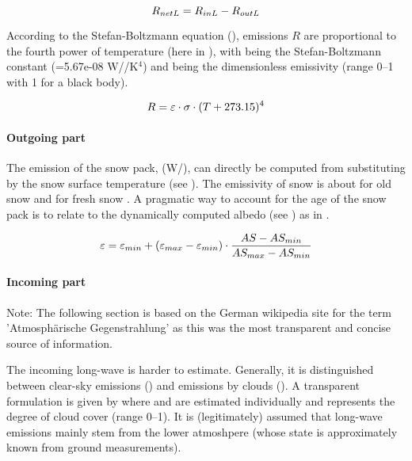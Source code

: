 \begin{equation} \label{eqb:radBalanceLongwave}
  R_{netL}= R_{inL} - R_{outL}
\end{equation}

According to the Stefan-Boltzmann equation (), emissions $R$ are proportional to the fourth power of temperature \temperature{} (here in \celsius), with \stefanBoltzmann{} being the Stefan-Boltzmann constant (=5.67e-08 W/\sqm/K$^4$) and \emissivity{} being the dimensionless emissivity (range 0--1 with 1 for a black body).

\begin{equation} \label{eqn:stefan-boltzmann}
  R= \varepsilon \cdot \sigma \cdot (T+273.15)^4
\end{equation}

\paragraph{Outgoing part}
The emission of the snow pack, \radLongwaveOut{} (W/\sqm), can directly be computed from  substituting \temperature{} by the snow surface temperature \snowSurfaceTemperature{} (see ). The emissivity of snow is about  for old snow and  for fresh snow \citep{Dyck1995}. A pragmatic way to account for the age of the snow pack is to relate \emissivity{} to the dynamically computed albedo \snowAlbedo{} (see ) as in .

\begin{equation} \label{eqn:emissivity-estimation}
  \varepsilon = \varepsilon_{min} + (\varepsilon_{max} - \varepsilon_{min}) \cdot \frac{AS - AS_{min}}{AS_{max} - AS_{min}}
\end{equation}

\paragraph{Incoming part}
Note: The following section is based on the German wikipedia site for the term 'Atmosphärische Gegenstrahlung' as this was the most transparent and concise source of information.

The incoming long-wave \radLongwaveIn{} is harder to estimate. Generally, it is distinguished between clear-sky emissions (\radLongwaveInClearsky{}) and emissions by clouds (\radLongwaveInClouds{}). A transparent formulation is given by  where \radLongwaveInClearsky{} and \radLongwaveInClouds{} are estimated individually and \cloudFraction{} represents the degree of cloud cover (range 0--1). It is (legitimately) assumed that long-wave emissions mainly stem from the lower atmoshpere (whose state is approximately known from ground measurements). 

